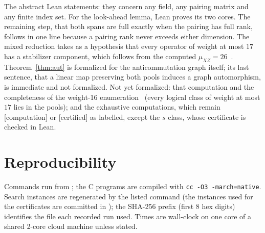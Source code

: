 \documentclass[11pt]{article}
\theoremstyle{definition}
\theoremstyle{remark}
\newcommand{\evidence}[1]{\textsf{[#1]}}
\newcommand{\repourl}{https://github.com/alectionary/vibe-math}
\newcommand{\rdir}{formalization/canonical-width/c16/restricted-frames-20261031}
\newcommand{\oursdir}[1]{\href{\repourl/tree/master/\rdir/#1}{\texttt{\detokenize{#1/}}}}
\begin{document}
The abstract Lean statements: they concern any field, any pairing matrix and any finite index set. For the look-ahead lemma, Lean proves its two cores. The remaining step, that both spans are full exactly when the pairing has full rank, follows in one line because a pairing rank never exceeds either dimension. The mixed reduction takes as a hypothesis that every operator of weight at most $17$ has a stabilizer component, which follows from the computed $\mu_{XZ}=26$~\cite{enumeration}. Theorem~\ref{thm:aut} is formalized for the anticommutation graph itself; its last sentence, that a linear map preserving both pools induces a graph automorphism, is immediate and not formalized. Not yet formalized: that computation and the completeness of the weight-16 enumeration~\cite{enumeration} (every logical class of weight at most $17$ lies in the pools); and the exhaustive computations, which remain \evidence{computation} or \evidence{certified} as labelled, except the $s$ class, whose certificate is checked in Lean.

\section{Reproducibility}\label{sec:repro}
Commands run from \texttt{}; the C programs are compiled with \texttt{cc -O3 -march=native}. Search instances are regenerated by the listed command (the instances used for the certificates are committed in \oursdir{certificates}); the SHA-256 prefix (first 8 hex digits) identifies the file each recorded run used. Times are wall-clock on one core of a shared 2-core cloud machine unless stated.
\end{document}

